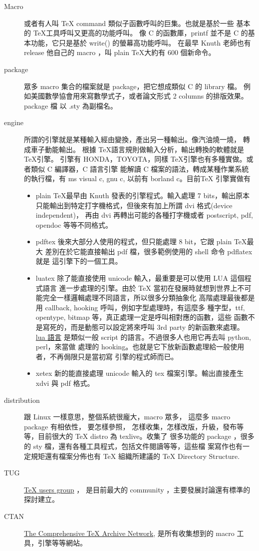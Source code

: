 \begin{description}
\item [Macro] 或者有人叫 {\TeX} command 類似子函數呼叫的巨集。也就是基於一些
基本的 \TeX 工具呼叫又更高的功能呼叫。
像 C 的函數厙，printf 並不是 C 的基本功能，它只是基於 write() 的螢幕高功能呼叫。
在最早 Knuth 老師也有 release 他自己的 macro ，叫 plain \TeX 大約有 600 個新命令。
\item [package] 眾多 macro 集合的檔案就是 package，把它想成類似 C 的 library 檔。
例如美國數學協會用來寫數學式子，或者論文形式 2 columns 的排版效果。package 檔
以 .sty 為副檔名。
\item [engine] 所謂的引擎就是某種輸入經由變換，產出另一種輸出。像汽油燒一燒，
轉成車子動能輸出。 根據 \TeX 語言規則做輸入分析，輸出轉換的軟體就是 \TeX 引擎。
引擎有 HONDA，TOYOTA，同樣 \TeX 引擎也有多種實做。或者類似 C 編譯器，C 語言引擎
能解讀 C 檔案的語法，轉成某種作業系統的執行檔，有 ms visual c, gnu c, 以前有
borland c。目前{\TeX} 引擎實做有
  \begin{itemize}
  \item plain \TeX 最早由 Knuth 發表的引擎程式。輸入處理 7 bits，輸出原本
  只能輸出到特定打字機格式，但後來有加上所謂 dvi 格式(device independent)，
  再由 dvi 再轉出可能的各種打字機或者 postscript, pdf, opendoc 等等不同格式。
  \item pdftex 後來大部分人使用的程式，但只能處理 8 bit，它跟 plain \TeX 最大
        差別在於它能直接輸出 pdf 檔，很多範例使用的 shell 命令 pdflatex 就是
        這引擎下的一個工具。
  \item luatex 除了能直接使用 unicode 輸入，最重要是可以使用 LUA 這個程式語言
	進一步處理的引擎。由於 \TeX
        當初在發展時就想到世界上不可能完全一樣邏輯處理不同語言，所以很多分類抽象化
	高階處理最後都是用 callback, hooking 呼叫，例如字型處理時，有這麼多
        種字型，ttf, opentype, bitmap 等，真正處理一定是呼叫相對應的函數，這些
        函數不是寫死的，而是動態可以設定將來呼叫 3rd party 的新函數來處理。
        \href{https://en.wikipedia.org/wiki/Lua_(programming_language)}{lua 語言}
        是類似一般 script 的語言。不過很多人也用它再去叫 python, perl，來當做
        處理的 hooking。也就是它下放新函數處理給一般使用者，不再侷限只是當初寫
        引擎的程式師而已。
  \item xetex 新的能直接處理 unicode 輸入的 tex 檔案引擎。輸出直接產生
  xdvi 與 pdf 格式。
  \end{itemize}
\item [distribution] 跟 Linux 一樣意思，整個系統很龐大，macro 眾多，
這麼多 macro package 有相依性， 要怎樣參照，
怎樣收集，怎樣改版，升級，發布等等，目前很大的 {\TeX} distro 為 texlive。收集了
很多功能的 package ，很多的 sty 檔，還有各種工具程式，包括文件閱讀等等，這些檔
案寫作也有一定規矩還有檔案分佈也有 {\TeX} 組織所建議的 TeX Directory Structure.
\item [TUG] \href{http://tug.org}{{\TeX} users group} ，
是目前最大的 community ，主要發展討論還有標準的探討建立。
\item [CTAN] \href{http://www.ctan.org}{The Comprehensive TeX Archive Network}, 
是所有收集想到的 macro 工具，引擎等等網站。
\end{description}
